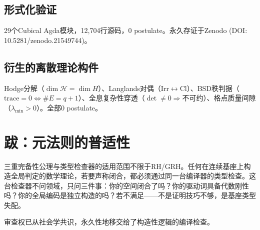 \documentclass{article}
\begin{document}
\subsection{形式化验证}
29个Cubical Agda模块，12,704行源码，0 postulate。永久存证于Zenodo (DOI: 10.5281/zenodo.21549744)。

\subsection{衍生的离散理论构件}
Hodge分解（$\dim\mathscr{H}=\dim H$）、Langlands对偶（$\mathrm{Irr}\leftrightarrow\mathrm{Cl}$）、BSD秩判据（$\mathrm{trace}=0\iff\#E=q+1$）、全息复杂性穿透（$\det\neq0\Rightarrow$不可约）、格点质量间隙（$\lambda_{\min}>0$）。全部0 postulate。

\section{跋：元法则的普适性}

三重完备性公理与类型检查器的适用范围不限于RH/GRH。任何在连续基座上构造全局判定的数学理论，若要声称闭合，都必须通过同一台编译器的类型检查。这台检查器不问领域，只问三件事：你的空间闭合了吗？你的驱动词具备代数刚性吗？你的全局编码是独立构造的吗？若不满足——不是证明技巧不够，是基座类型失配。

审查权已从社会学共识，永久性地移交给了构造性逻辑的编译检查。
\end{document}
